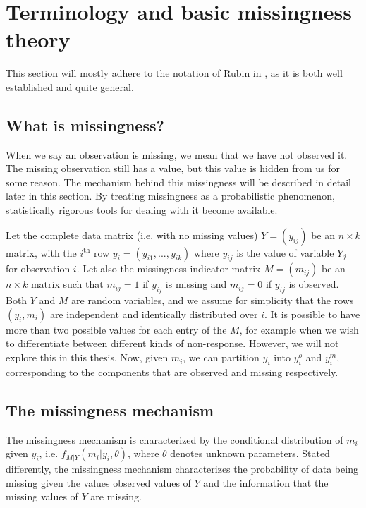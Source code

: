 \documentclass{article}
\begin{document}
	
	\section{Terminology and basic missingness theory}
	This section will mostly adhere to the notation of Rubin in \cite{Little2019}, as it is both well established and quite general.
	
	\subsection{What is missingness?}
	When we say an observation is missing, we mean that we have not observed it. The missing observation still has a value, but this value is hidden from us for some reason. The mechanism behind this missingness will be described in detail later in this section. By treating missingness as a probabilistic phenomenon, statistically rigorous tools for dealing with it become available. 
	
	Let the complete data matrix (i.e. with no missing values) $Y=(y_{ij})$ be an $n \times k$ matrix, with the $i^{\text{th}}$ row $y_{i}=(y_{i1}, ..., y_{ik})$ where $y_{ij}$ is the value of variable $Y_{j}$ for observation $i$. Let also the missingness indicator matrix $M = (m_{ij})$ be an $n \times k$ matrix such that $m_{ij} = 1$ if $y_{ij}$ is missing and $m_{ij} = 0$ if $y_{ij}$ is observed. Both $Y$ and $M$ are random variables, and we assume for simplicity that the rows $(y_{i}, m_{i})$ are independent and identically distributed over $i$. It is possible to have more than two possible values for each entry of the $M$, for example when we wish to differentiate between different kinds of non-response. However, we will not explore this in this thesis. Now, given $m_{i}$, we can partition $y_{i}$ into $y^{o}_{i}$ and $y^{m}_{i}$, corresponding to the components that are observed and missing respectively. 
	
	\subsection{The missingness mechanism}
	
	The missingness mechanism is characterized by the conditional distribution of $m_{i}$ given $y_{i}$, i.e. $f_{M|Y}(m_{i}|y_{i}, \theta)$, where $\theta$ denotes unknown parameters. Stated differently, the missingness mechanism characterizes the probability of data being missing given the values observed values of $Y$ and the information that the missing values of $Y$ are missing. 
	
\end{document}
